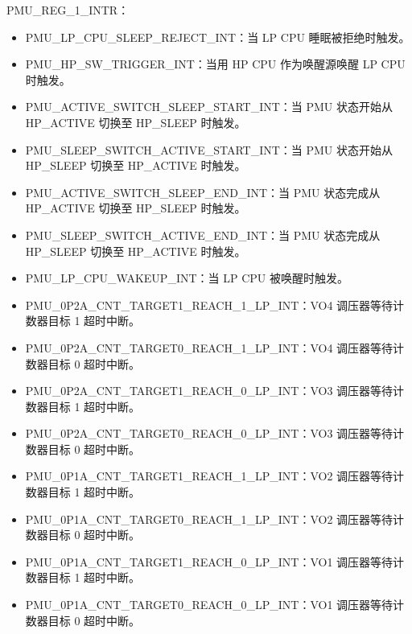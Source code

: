 \documentclass[main\_\_CN.tex]{subfiles}
\begin{document}
PMU\_REG\_1\_INTR：
\begin{itemize}
\item \label{int:PMULPCPUSLEEPREJECTINT}PMU\_LP\_CPU\_SLEEP\_REJECT\_INT：当 LP CPU 睡眠被拒绝时触发。

\item \label{int:PMUHPSWTRIGGERINT}PMU\_HP\_SW\_TRIGGER\_INT：当用 HP CPU 作为唤醒源唤醒 LP CPU 时触发。

\item \label{int:PMUACTIVESWITCHSLEEPSTARTINT}PMU\_ACTIVE\_SWITCH\_SLEEP\_START\_INT：当 PMU 状态开始从 HP\_ACTIVE 切换至 HP\_SLEEP 时触发。

\item \label{int:PMUSLEEPSWITCHACTIVESTARTINT}PMU\_SLEEP\_SWITCH\_ACTIVE\_START\_INT：当 PMU 状态开始从 HP\_SLEEP 切换至 HP\_ACTIVE 时触发。

\item \label{int:PMUACTIVESWITCHSLEEPENDINT}PMU\_ACTIVE\_SWITCH\_SLEEP\_END\_INT：当 PMU 状态完成从 HP\_ACTIVE 切换至 HP\_SLEEP 时触发。

\item \label{int:PMUSLEEPSWITCHACTIVEENDINT}PMU\_SLEEP\_SWITCH\_ACTIVE\_END\_INT：当 PMU 状态完成从 HP\_SLEEP 切换至 HP\_ACTIVE 时触发。
\item \label{int:PMULPCPUWAKEUPINT}PMU\_LP\_CPU\_WAKEUP\_INT：当 LP CPU 被唤醒时触发。
\item \label{int:PMU0P2ACNTTARGET1REACH1LPINT}PMU\_0P2A\_CNT\_TARGET1\_REACH\_1\_LP\_INT：VO4 调压器等待计数器目标 1 超时中断。
\item \label{int:PMU0P2ACNTTARGET0REACH1LPINT}PMU\_0P2A\_CNT\_TARGET0\_REACH\_1\_LP\_INT：VO4 调压器等待计数器目标 0 超时中断。
\item \label{int:PMU0P2ACNTTARGET1REACH0LPINT}PMU\_0P2A\_CNT\_TARGET1\_REACH\_0\_LP\_INT：VO3 调压器等待计数器目标 1 超时中断。
\item \label{int:PMU0P2ACNTTARGET0REACH0LPINT}PMU\_0P2A\_CNT\_TARGET0\_REACH\_0\_LP\_INT：VO3 调压器等待计数器目标 0 超时中断。
\item \label{int:PMU0P1ACNTTARGET1REACH1LPINT}PMU\_0P1A\_CNT\_TARGET1\_REACH\_1\_LP\_INT：VO2 调压器等待计数器目标 1 超时中断。
\item \label{int:PMU0P1ACNTTARGET0REACH1LPINT}PMU\_0P1A\_CNT\_TARGET0\_REACH\_1\_LP\_INT：VO2 调压器等待计数器目标 0 超时中断。
\item \label{int:PMU0P1ACNTTARGET1REACH0LPINT}PMU\_0P1A\_CNT\_TARGET1\_REACH\_0\_LP\_INT：VO1 调压器等待计数器目标 1 超时中断。
\item \label{int:PMU0P1ACNTTARGET0REACH0LPINT}PMU\_0P1A\_CNT\_TARGET0\_REACH\_0\_LP\_INT：VO1 调压器等待计数器目标 0 超时中断。
\end{itemize}
\end{document}
